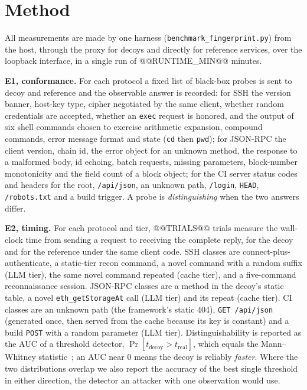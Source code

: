 \documentclass[conference]{IEEEtran}
\begin{document}
\section{Method}
\label{sec:method}
All measurements are made by one harness (\texttt{benchmark\_fingerprint.py}) from the host, through the proxy for decoys and directly for reference services, over the loopback interface, in a single run of @@RUNTIME_MIN@@ minutes.

\textbf{E1, conformance.} For each protocol a fixed list of black-box probes is sent to decoy and reference and the observable answer is recorded: for SSH the version banner, host-key type, cipher negotiated by the same client, whether random credentials are accepted, whether an \texttt{exec} request is honored, and the output of six shell commands chosen to exercise arithmetic expansion, compound commands, error message format and state (\texttt{cd} then \texttt{pwd}); for JSON-RPC the client version, chain id, the error object for an unknown method, the response to a malformed body, id echoing, batch requests, missing parameters, block-number monotonicity and the field count of a block object; for the CI server status codes and headers for the root, \texttt{/api/json}, an unknown path, \texttt{/login}, \texttt{HEAD}, \texttt{/robots.txt} and a build trigger. A probe is \emph{distinguishing} when the two answers differ.

\textbf{E2, timing.} For each protocol and tier, @@TRIALS@@ trials measure the wall-clock time from sending a request to receiving the complete reply, for the decoy and for the reference under the same client code. SSH classes are connect-plus-authenticate, a static-tier recon command, a novel command with a random suffix (LLM tier), the same novel command repeated (cache tier), and a five-command reconnaissance session. JSON-RPC classes are a method in the decoy's static table, a novel \texttt{eth\_getStorageAt} call (LLM tier) and its repeat (cache tier). CI classes are an unknown path (the framework's static 404), \texttt{GET /api/json} (generated once, then served from the cache because its key is constant) and a build \texttt{POST} with a random parameter (LLM tier). Distinguishability is reported as the AUC of a threshold detector, $\Pr[t_{\mathrm{decoy}} > t_{\mathrm{real}}]$, which equals the Mann--Whitney statistic~\cite{ref15}; an AUC near 0 means the decoy is reliably \emph{faster}. Where the two distributions overlap we also report the accuracy of the best single threshold in either direction, the detector an attacker with one observation would use.
\end{document}
